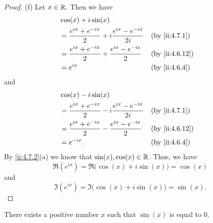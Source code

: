 \begin{proof}{(f)}
  Let \(x \in \mathbb{R}\).
  Then we have
  \begin{align*}
     & \cos(x) + i \sin(x)                                                                      \\
     & = \dfrac{e^{i x} + e^{- i x}}{2} + i \dfrac{e^{i x} - e^{- i x}}{2i} &  & \by{ii:4.7.1}  \\
     & = \dfrac{e^{i x} + e^{- i x}}{2} + \dfrac{e^{i x} - e^{- i x}}{2}    &  & \by{ii:4.6.12} \\
     & = e^{i x}                                                            &  & \by{ii:4.6.4}
  \end{align*}
  and
  \begin{align*}
     & \cos(x) - i \sin(x)                                                                      \\
     & = \dfrac{e^{i x} + e^{- i x}}{2} - i \dfrac{e^{i x} - e^{- i x}}{2i} &  & \by{ii:4.7.1}  \\
     & = \dfrac{e^{i x} + e^{- i x}}{2} - \dfrac{e^{i x} - e^{- i x}}{2}    &  & \by{ii:4.6.12} \\
     & = e^{- i x}.                                                         &  & \by{ii:4.6.4}
  \end{align*}
  By \cref{ii:4.7.2}(a) we know that \(\sin(x), \cos(x) \in \mathbb{R}\).
  Thus, we have
  \[
    \Re(e^{i x}) = \Re\big(\cos(x) + i \sin(x)\big) = \cos(x)
  \]
  and
  \[
    \Im(e^{i x}) = \Im\big(\cos(x) + i \sin(x)\big) = \sin(x).
  \]
\end{proof}

\begin{lem}\label{ii:4.7.3}
  There exists a positive number \(x\) such that \(\sin(x)\) is equal to \(0\).
\end{lem}

